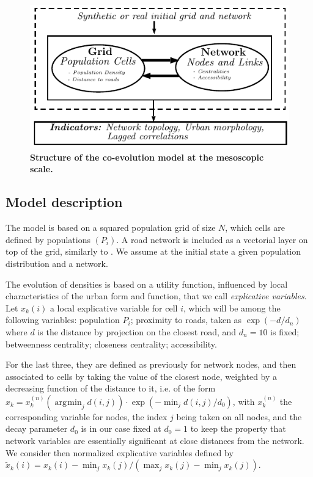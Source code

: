 \documentclass[11pt]{article}
\DeclareMathOperator*{\argmin}{\arg\!\min}
\begin{document}
\begin{figure}
	\includegraphics[width=\linewidth]{mesocoevol.pdf}
	\caption{\textbf{Structure of the co-evolution model at the mesoscopic scale.}\label{fig:mesocoevolmodel:workflow}}
\end{figure}

\subsection{Model description}


The model is based on a squared population grid of size $N$, which cells are defined by populations $(P_i)$. A road network is included as a vectorial layer on top of the grid, similarly to \cite{raimbault2014hybrid}. We assume at the initial state a given population distribution and a network.

The evolution of densities is based on a utility function, influenced by local characteristics of the urban form and function, that we call \emph{explicative variables}. Let $x_k(i)$ a local explicative variable for cell $i$, which will be among the following variables: population $P_i$; proximity to roads, taken as $\exp (-d / d_n)$ where $d$ is the distance by projection on the closest road, and $d_n=10$ is fixed; betweenness centrality; closeness centrality; accessibility.

For the last three, they are defined as previously for network nodes, and then associated to cells by taking the value of the closest node, weighted by a decreasing function of the distance to it, i.e. of the form $x_k = x^{(n)}_k (\argmin_j d(i,j)) \cdot \exp \left( -  \min_j d(i,j) / d_0 \right)$, with $x^{(n)}_k$ the corresponding variable for nodes, the index $j$ being taken on all nodes, and the decay parameter $d_0$ is in our case fixed at $d_0=1$ to keep the property that network variables are essentially significant at close distances from the network. We consider then normalized explicative variables defined by $\tilde{x}_k(i) = x_k(i) - \min_j x_k(j) / (\max_j x_k(j) - \min_j x_k(j))$.
\end{document}
